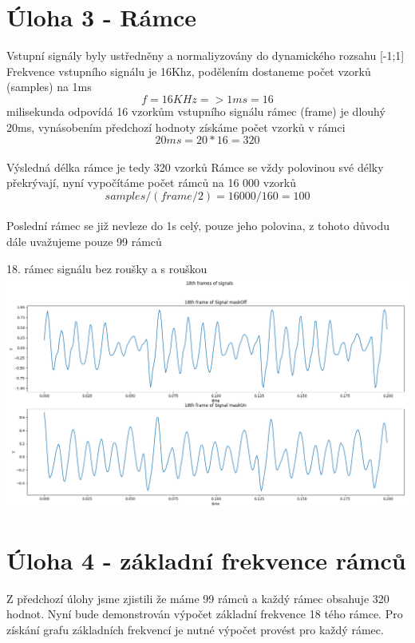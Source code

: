 \documentclass[12pt,czech]{article}
\begin{document}
\section{Úloha 3 - Rámce}
    Vstupní signály byly ustředněny a normaliyzovány do dynamického rozsahu [-1;1]\newline
    Frekvence vstupního signálu je 16Khz, podělením dostaneme počet vzorků (samples) na 1ms\newline
    \[f = 16KHz => 1ms = 16\] milisekunda odpovídá 16 vzorkům vstupního signálu\newline {} rámec (frame) je dlouhý 20ms, vynásobením předchozí hodnoty získáme počet vzorků v rámci\\
    \[ 20ms = 20*16 = 320 \]\\
    Výsledná délka rámce je tedy 320 vzorků \newline \newline
    Rámce se vždy polovinou své délky překrývají, nyní vypočítáme počet rámců na 16 000 vzorků \newline
    \[samples/(frame/2) = 16000/160 = 100 \] \\
    Poslední rámec se již nevleze do 1s celý, pouze jeho polovina, z tohoto důvodu dále uvažujeme pouze 99 rámců
    
    \begin{center}
        18. rámec signálu bez roušky a s rouškou
        \hfill\includegraphics[scale=0.48]{images/18thframe.png}\hspace*{\fill}
    \end{center}
\clearpage

\section{Úloha 4 - základní frekvence rámců }
    Z předchozí úlohy jsme zjistili že máme 99 rámců a každý rámec obsahuje 320 hodnot. Nyní bude demonstrován výpočet základní frekvence 18 tého rámce. Pro získání grafu základních frekvencí je nutné výpočet provést pro každý rámec.
    
\end{document}
